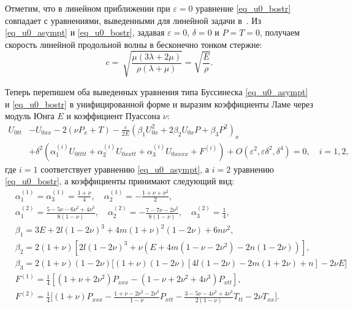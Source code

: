 \documentclass[12pt, a4paper]{report}
\begin{document}
Отметим, что в линейном приближении при $\varepsilon = 0$ уравнение \eqref{eq_u0_bostr} совпадает с уравнениями, выведенными для линейной задачи в~\cite{bostrm2000}.
Из \eqref{eq_u0_asympt} и \eqref{eq_u0_bostr}, задавая $\varepsilon = 0$, $\delta = 0$ и $P = T = 0$, получаем скорость линейной продольной волны в бесконечно тонком стержне:
\begin{equation}
\label{lin_velocity}
c = \ \sqrt{\frac{\mu(3\lambda + 2\mu)}{\rho(\lambda+\mu)}} = \sqrt{\frac{E}{\rho}}.
\end{equation}

Теперь перепишем оба выведенных уравнения типа Буссинеска \eqref{eq_u0_asympt} и \eqref{eq_u0_bostr} в унифицированной форме и выразим коэффициенты Ламе через модуль Юнга $ E $ и коэффициент Пуассона $ \nu $:
\begin{equation}\label{eq_u0_fin}
\begin{split}
U_{0tt} &- U_{0xx} - 2\left(\nu P_{x} + T\right) - \frac{\varepsilon}{2 E} \left(\beta_1U_{0x}^2 + 2 \beta_2 U_{0x} P + \beta_3 P^2 \right)_x \\
&+ \delta^2 \left(\alpha_1^{(i)} U_{0tttt} + \alpha_2^{(i)} U_{0xxtt} + \alpha_3^{(i)} U_{0xxxx} + F^{(i)}\right) + O(\varepsilon^2, \varepsilon\delta^2, \delta^4) = 0, \quad i = 1,2,
\end{split}
\end{equation}
где $i=1$ соответствует уравнению \eqref{eq_u0_asympt}, а $i=2$ уравнению \eqref{eq_u0_bostr}, а коэффициенты принимают следующий вид:
\begin{align}
\label{alpha_1}
&\alpha_1^{(1)} = \alpha_3^{(1)} = \frac{1 + \nu}{4}, \quad \alpha_2^{(1)} = -\frac{1 + \nu + \nu^2}{2}, \\
\label{alpha_2}
&\alpha_1^{(2)} = \frac{5 - 5\nu - 6\nu^2 + 4\nu^3}{8(1-\nu)},\quad \alpha_2^{(2)} = -\frac{7 - 7\nu - 2\nu^2}{8(1-\nu)}, \quad \alpha_3^{(2)} = \frac14,\\
\label{beta_1}
&\beta_1 = 3E + 2l(1 - 2\nu)^3 + 4m(1 + \nu)^2 (1 - 2\nu) + 6n\nu^2,\\
\label{beta_2}
&\beta_2 = 2 (1 + \nu) \left[2 l (1 - 2 \nu)^3 + \nu \left(E + 4m \left(1 - \nu - 2\nu^2\right) - 2n (1 - 2\nu)\right) \right],\\
\label{beta_3}
&\beta_3 = 2(1 + \nu)(1 - 2 \nu) \Big[ (1 + \nu)(1 - 2\nu) [4l \left(1 - 2\nu\right) - 2m(1 + 2\nu) + n] - 2\nu E \Big]\\
\label{F1}
&F^{(1)} = \frac{1}{4} \left[(1 + \nu + 2\nu^2) P_{xxx} - (1 - \nu + 2\nu^2 + 4\nu^3) P_{xtt}\right],\\
\label{F2}
&F^{(2)} = \frac{1}{4} \bigg[ (1 + \nu) P_{xxx} - \frac{1 + \nu - 2\nu^2 - 2\nu^3}{1 - \nu} P_{xtt} - \frac{3 - 5\nu - 4\nu^2 + 4\nu^3}{2(1 - \nu)} T_{tt} - 2\nu T_{xx}\bigg].
\end{align}
\end{document}
